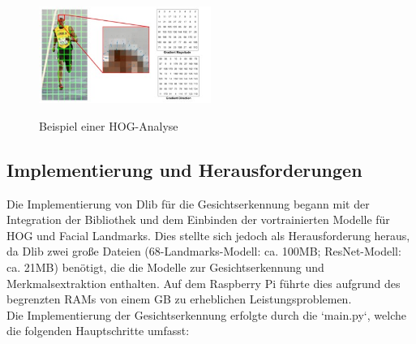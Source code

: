 \begin{figure}[h!]
    \centering
    \includegraphics[width=0.5\textwidth]{pictures/hog.jpg}
    \caption{Beispiel einer HOG-Analyse}
    \label{fig:hoganalysis}
    \cite{hoganalysis}
\end{figure}


\subsection{Implementierung und Herausforderungen}
Die Implementierung von Dlib für die Gesichtserkennung begann mit der Integration der Bibliothek und dem Einbinden der vortrainierten Modelle für HOG und Facial Landmarks. Dies stellte sich jedoch als Herausforderung heraus, da Dlib zwei große Dateien (68-Landmarks-Modell: ca. 100MB; ResNet-Modell: ca. 21MB) benötigt, die die Modelle zur Gesichtserkennung und Merkmalsextraktion enthalten. Auf dem Raspberry Pi führte dies aufgrund des begrenzten RAMs von einem GB zu erheblichen Leistungsproblemen. \\ 

\noindent Die Implementierung der Gesichtserkennung erfolgte durch die `main.py`, welche die folgenden Hauptschritte umfasst:

